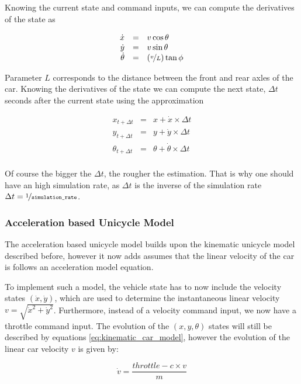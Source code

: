 Knowing the current state and command inputs, we can compute the derivatives of the state as 

\[
\label{eq:kinematic_car_model}
\begin{array}{rcl}
\dot{x} & = & v \cos{\theta} \\
\dot{y} & = & v \sin{\theta} \\
\dot{\theta} & = & ( \nicefrac{v}{L} ) \tan{\phi} 
\end{array}
\]

Parameter $L$ corresponds to the distance between the front and rear axles of the car. Knowing the derivatives of the state we can compute the next state, $\Delta t$ seconds after the current state using the approximation

\[
\begin{array}{rcl} 
x_{t+\Delta t} & = & x + \dot{x} \times \Delta t \\
y_{t+\Delta t} & = & y + \dot{y} \times \Delta t \\
\theta_{t+\Delta t} & = & \theta + \dot{\theta} \times \Delta t \\
\end{array}
\]

Of course the bigger the $\Delta t$, the rougher the estimation. That is why one should have an high simulation rate, as $\Delta t$ is the inverse of the simulation rate $\Delta t = \nicefrac{1}{\texttt{simulation\_rate}}$.

\subsubsection{Acceleration based Unicycle Model}
\label{subsubsec:acceleration_based_unicycle_model}

The acceleration based unicycle model builds upon the kinematic unicycle model described before, however it now adds assumes that the linear velocity of the car is follows an acceleration model equation.

To implement such a model, the vehicle state has to now include the velocity states $(\dot{x},\dot{y})$, which are used to determine the instantaneous linear velocity $v=\sqrt{\dot{x}^2 + \dot{y}^2}$. Furthermore, instead of a velocity command input, we now have a throttle command input. The evolution of the $(x,y,\theta)$ states will still be described by equations \ref{eq:kinematic_car_model}, however the evolution of the linear car velocity $v$ is given by:

\[
\dot{v} = \frac{throttle - c\times v}{m}
\]

